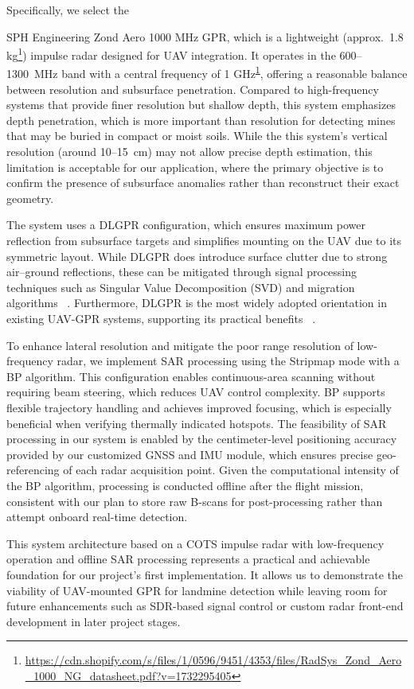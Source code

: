 Specifically, we select the {SPH Engineering Zond Aero 1000 MHz GPR, which is a lightweight (approx.\ 1.8 kg\footnote{\label{Zond}\url{https://cdn.shopify.com/s/files/1/0596/9451/4353/files/RadSys_Zond_Aero_1000_NG_datasheet.pdf?v=1732295405}}) impulse radar designed for UAV integration. It operates in the 600–1300~MHz band with a central frequency of 1 GHz\textsuperscript{\ref{Zond}}, offering a reasonable balance between resolution and subsurface penetration. Compared to high-frequency systems that provide finer resolution but shallow depth, this system emphasizes depth penetration, which is more important than resolution for detecting mines that may be buried in compact or moist soils. While the this system's vertical resolution (around 10--15~cm) may not allow precise depth estimation, this limitation is acceptable for our application, where the primary objective is to confirm the presence of subsurface anomalies rather than reconstruct their exact geometry.

The system uses a DLGPR configuration, which ensures maximum power reflection from subsurface targets and simplifies mounting on the UAV due to its symmetric layout. While DLGPR does introduce surface clutter due to strong air–ground reflections, these can be mitigated through signal processing techniques such as Singular Value Decomposition (SVD) and migration algorithms ~\cite{garcia2024comparison}. Furthermore, DLGPR is the most widely adopted orientation in existing UAV-GPR systems, supporting its practical benefits ~\cite{alqudsi2021review}.

To enhance lateral resolution and mitigate the poor range resolution of low-frequency radar, we implement SAR processing using the Stripmap mode with a BP algorithm. This configuration enables continuous-area scanning without requiring beam steering, which reduces UAV control complexity. BP supports flexible trajectory handling and achieves improved focusing, which is especially beneficial when verifying thermally indicated hotspots. The feasibility of SAR processing in our system is enabled by the centimeter-level positioning accuracy provided by our customized GNSS and IMU module, which ensures precise geo-referencing of each radar acquisition point. Given the computational intensity of the BP algorithm, processing is conducted offline after the flight mission, consistent with our plan to store raw B-scans for post-processing rather than attempt onboard real-time detection.

This system architecture based on a COTS impulse radar with low-frequency operation and offline SAR processing represents a practical and achievable foundation for our project's first implementation. It allows us to demonstrate the viability of UAV-mounted GPR for landmine detection while leaving room for future enhancements such as SDR-based signal control or custom radar front-end development in later project stages.


}
